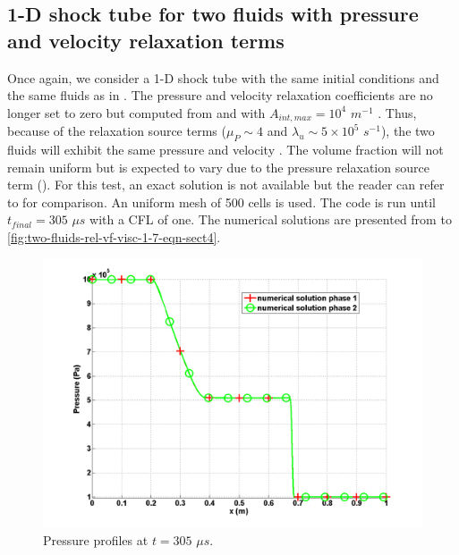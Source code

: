 \subsection{1-D shock tube for two fluids with pressure and velocity relaxation terms}\label{sec:1d-2-phases-rel-7-eq-sct4}
Once again, we consider a 1-D shock tube with the same initial conditions and the same fluids as in . The pressure and velocity relaxation coefficients are no longer set to zero but computed from  and  with $A_{int,max} =  10^4$ $m^{-1}$ . Thus, because of the relaxation source terms ($\mu_P \sim 4$ and $\lambda_u \sim 5 \times 10^5$ $s^{-1}$), the two fluids will exhibit the same pressure and velocity  . The volume fraction will not remain uniform but is expected to vary due to the pressure relaxation source term (). For this test, an exact solution is not available but the reader can refer to \cite{Saurel_2007} for comparison. An uniform mesh of 500 cells is used. The code is run until $t_{final} = 305$ $\mu s$ with a CFL   of one. The numerical solutions are presented from  to \ref{fig:two-fluids-rel-vf-visc-1-7-eqn-sect4}.
%
\begin{figure}[H]
\centering
\includegraphics[width=\textwidth]{figures/SEM/relaxation_two_phases_pressure.png}
\caption{Pressure profiles at $t=305$ $\mu s$.}
\label{fig:two-fluids-rel-press-7-eqn-sect4}
\end{figure}
